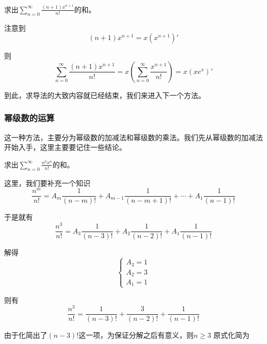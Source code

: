 \documentclass[lang=cn,10pt]{elegantbook}
\begin{document}
		\begin{example}
			求出$\sum_{n=0}^{\infty }\frac{(n+1)x^{n+1}}{n!} $的和。
		\end{example}
		
		注意到
		\begin{equation*}
			(n+1)x^{n+1}=x(x^{n+1})'
		\end{equation*}
		
		则
		\begin{equation*}
			\sum_{n=0}^{\infty }\frac{(n+1)x^{n+1}}{n!}=x(\sum_{n=0}^{\infty }\frac{x^{n+1}}{n!})=x(xe^{x})'
		\end{equation*}
		
		到此，求导法的大致内容就已经结束，我们来进入下一个方法。
	\subsubsection{幂级数的运算}
	
	这一种方法，主要分为幂级数的加减法和幂级数的乘法。我们先从幂级数的加减法开始入手，这里主要要记住一些结论。
	
		\begin{example}
			求出$\sum_{n=0}^{\infty }\frac{n^{3}x^{n}}{n!} $的和。
		\end{example}
		
		这里，我们要补充一个知识
		\begin{equation*}
			\frac{n^{m}}{n!}=A_{m}\frac{1}{(n-m)!}+A_{m-1}\frac{1}{(n-m+1)!}+\cdots+A_{1}\frac{1}{(n-1)!}
		\end{equation*}
		
		于是就有
		\begin{equation*}
			\frac{n^{3}}{n!}=A_{3}\frac{1}{(n-3)!}+A_{2}\frac{1}{(n-2)!}+A_{1}\frac{1}{(n-1)!}
		\end{equation*}
		
		解得
		\begin{equation*}
			\begin{cases}
				A_{3}=1\\
				A_{2}=3\\
				A_{1}=1
			\end{cases}
		\end{equation*}
		
		则有
		\begin{equation*}
			\frac{n^{3}}{n!}=\frac{1}{(n-3)!}+\frac{3}{(n-2)!}+\frac{1}{(n-1)!}
		\end{equation*}
		
		由于化简出了$(n-3)!$这一项，为保证分解之后有意义，则$n\ge 3$
		原式化简为
		
\end{document}
